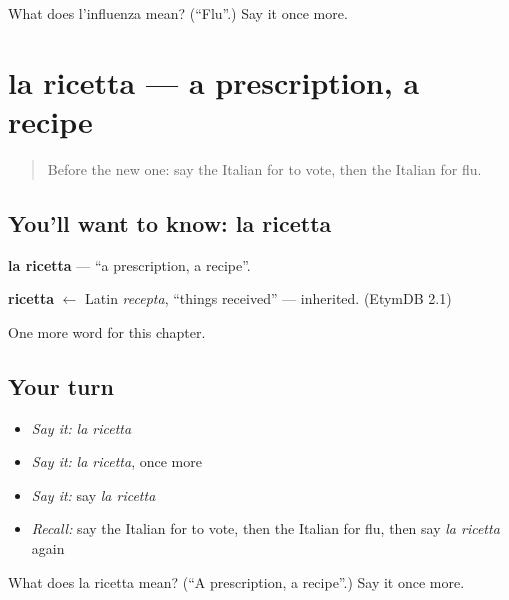 \begin{tcolorbox}[breakable,colback=teal!4,colframe=teal!35!black,title={Before you move on}]
What does l'influenza mean? (\textquotedblleft{}Flu\textquotedblright{}.) Say it once more.
\end{tcolorbox}
\section[la ricetta]{la ricetta — a prescription, a recipe}

\label{lesson:IT-C215-ricetta}



\begin{quote}
Before the new one: say the Italian for to vote, then the Italian for flu.
\end{quote}

\subsection*{You'll want to know: la ricetta}
\textbf{la ricetta} — \textquotedblleft{}a prescription, a recipe\textquotedblright{}.

\begin{cousinweb}
\textbf{ricetta} $\leftarrow$ Latin \emph{recepta}, \textquotedblleft{}things received\textquotedblright{} — inherited. (EtymDB 2.1)
\end{cousinweb}

\begin{grammarlens}[title={What you've built}]
One more word for this chapter.
\end{grammarlens}

\subsection*{Your turn}
\begin{itemize}
\raggedright
  \item \emph{Say it:} \emph{la ricetta}
  \item \emph{Say it:} \emph{la ricetta}, once more
  \item \emph{Say it:} say \emph{la ricetta}
  \item \emph{Recall:} say the Italian for to vote, then the Italian for flu, then say \emph{la ricetta} again
\end{itemize}

\begin{tcolorbox}[breakable,colback=teal!4,colframe=teal!35!black,title={Before you move on}]
What does la ricetta mean? (\textquotedblleft{}A prescription, a recipe\textquotedblright{}.) Say it once more.
\end{tcolorbox}
